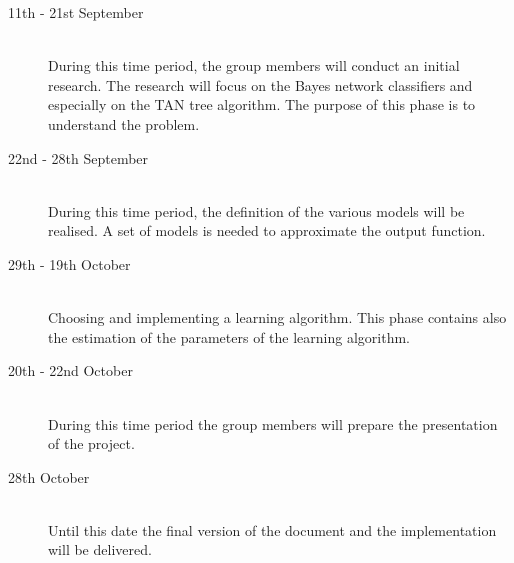 \documentclass[a4paper, 11pt]{scrartcl}
\begin{document}
\begin{description}
	\item[11th - 21st September]\-\\
	During this time period, the group members will conduct an initial research. The research will focus on the Bayes network classifiers and especially on the TAN tree algorithm. The purpose of this phase is to understand the problem.
	\item[22nd - 28th September]\-\\
	During this time period, the definition of the various models will be realised. A set of models is needed to approximate the output function.
	\item[29th - 19th October]\-\\
	Choosing and implementing a learning algorithm. This phase contains also the estimation of the parameters of the learning algorithm.
	\item[20th - 22nd October]\-\\
	During this time period the group members will prepare the presentation of the project.
	\item[28th October]\-\\
	Until this date the final version of the document and the implementation will be delivered.
\end{description}


\nocite{*} %


\end{document}
